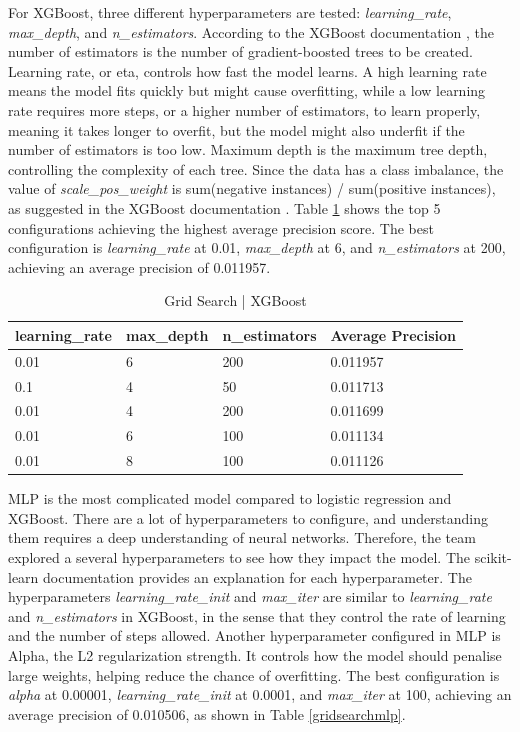 \documentclass[ %
                    author={Natchalin Iwsakul \\[0.4em] Inkaphol Siriwongwattana \\[0.4em] Tanaphan Kummaraphat \\[0.6em] Patorn Srisupap},,
                supervisor={Fernando Moreno-Pino},
                    degree={MSc},
                     title={Propensity Modelling for SME Commercial Lending Using Open Public Data
},
                  subtitle={Companies House and GDELT as predictors of first-time borrowing},
                      type={},
                      year={2026}]{dissertation}
\begin{document}
  For XGBoost, three different hyperparameters are tested: \textit{learning\_rate}, \textit{max\_depth}, and \textit{n\_estimators}. According to the XGBoost documentation \cite{noauthor_xgboost_nodate}, the number of estimators is the number of gradient-boosted trees to be created. Learning rate, or eta, controls how fast the model learns. A high learning rate means the model fits quickly but might cause overfitting, while a low learning rate requires more steps, or a higher number of estimators, to learn properly, meaning it takes longer to overfit, but the model might also underfit if the number of estimators is too low. Maximum depth is the maximum tree depth, controlling the complexity of each tree. Since the data has a class imbalance, the value of \textit{scale\_pos\_weight} is sum(negative instances) / sum(positive instances), as suggested in the XGBoost documentation \cite{noauthor_xgboost_nodate}. Table \ref{gridsearchxgboost} shows the top 5 configurations achieving the highest average precision score. The best configuration is \textit{learning\_rate} at 0.01, \textit{max\_depth} at 6, and \textit{n\_estimators} at 200, achieving an average precision of 0.011957.

  \begin{table}[h]
      \centering
      \begin{tabular}{llll}
      \toprule
          learning\_rate & max\_depth & n\_estimators & Average Precision \\
      \midrule
          0.01 & 6 & 200 & 0.011957 \\
          0.1 & 4 & 50 & 0.011713 \\
          0.01 & 4 & 200 & 0.011699 \\
          0.01 & 6 & 100 & 0.011134 \\
          0.01 & 8 & 100 & 0.011126 \\
      \bottomrule
      \end{tabular}
      \caption{Grid Search | XGBoost}
      \label{gridsearchxgboost}
  \end{table}

  MLP is the most complicated model compared to logistic regression and XGBoost. There are a lot of hyperparameters to configure, and understanding them requires a deep understanding of neural networks. Therefore, the team explored a several hyperparameters to see how they impact the model. The scikit-learn documentation \cite{Pedregosa_Scikit-learn_Machine_Learning_2011} provides an explanation for each hyperparameter. The hyperparameters \textit{learning\_rate\_init} and \textit{max\_iter} are similar to \textit{learning\_rate} and \textit{n\_estimators} in XGBoost, in the sense that they control the rate of learning and the number of steps allowed. Another hyperparameter configured in MLP is Alpha, the L2 regularization strength. It controls how the model should penalise large weights, helping reduce the chance of overfitting. The best configuration is \textit{alpha} at 0.00001, \textit{learning\_rate\_init} at 0.0001, and \textit{max\_iter} at 100, achieving an average precision of 0.010506, as shown in Table \ref{gridsearchmlp}.
\end{document}
